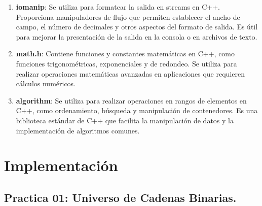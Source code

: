 \documentclass{article}
\begin{document}
\begin{enumerate}
            \item \textbf{iomanip}: Se utiliza para formatear la salida en streams en C++. Proporciona manipuladores de flujo que
            permiten establecer el ancho de campo, el número de decimales y otros aspectos del formato de salida. Es útil para mejorar
            la presentación de la salida en la consola o en archivos de texto.

            \item \textbf{math.h}: Contiene funciones y constantes matemáticas en C++, como funciones trigonométricas, exponenciales y
            de redondeo. Se utiliza para realizar operaciones matemáticas avanzadas en aplicaciones que requieren cálculos numéricos.

            \item \textbf{algorithm}: Se utiliza para realizar operaciones en rangos de elementos en C++, como ordenamiento, búsqueda
            y manipulación de contenedores. Es una biblioteca estándar de C++ que facilita la manipulación de datos y la
            implementación de algoritmos comunes.
        \end{enumerate}

\section{Implementación}
    \subsection{Practica 01: Universo de Cadenas Binarias.}
\end{document}

